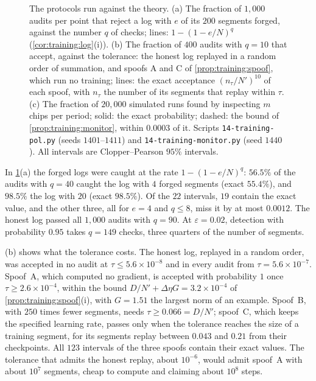 \begin{refsection}
\begin{figure}[t]
\caption{The protocols run against the theory. (a) The fraction of $1{,}000$ audits per point that reject a log with $e$ of its $200$ segments forged, against the number $q$ of checks; lines: $1-(1-e/N)^q$ (\cref{cor:training:log}(i)). (b) The fraction of $400$ audits with $q=10$ that accept, against the tolerance: the honest log replayed in a random order of summation, and spoofs A and C of \cref{prop:training:spoof}, which run no training; lines: the exact acceptance $(n_\tau/N')^{10}$ of each spoof, with $n_\tau$ the number of its segments that replay within $\tau$. (c) The fraction of $20{,}000$ simulated runs found by inspecting $m$ chips per period; solid: the exact probability; dashed: the bound of \cref{prop:training:monitor}, within $0.0003$ of it. Scripts \texttt{14-training-pol.py} (seeds $1401$--$1411$) and \texttt{14-training-monitor.py} (seed $1440$). All intervals are Clopper--Pearson $95\%$ intervals.}\label{fig:training:runs}
\end{figure}

In \cref{fig:training:runs}(a) the forged logs were caught at the rate $1-(1-e/N)^q$: $56.5\%$ of the audits with $q=40$ caught the log with $4$ forged segments (exact $55.4\%$), and $98.5\%$ the log with $20$ (exact $98.5\%$). Of the $22$ intervals, $19$ contain the exact value, and the other three, all for $e=4$ and $q\le8$, miss it by at most $0.0012$. The honest log passed all $1{,}000$ audits with $q=90$. At $\varepsilon=0.02$, detection with probability $0.95$ takes $q=149$ checks, three quarters of the number of segments.

(b) shows what the tolerance costs. The honest log, replayed in a random order, was accepted in no audit at $\tau\le5.6\times10^{-8}$ and in every audit from $\tau=5.6\times10^{-7}$. Spoof~A, which computed no gradient, is accepted with probability $1$ once $\tau\ge2.6\times10^{-4}$, within the bound $D/N'+\Delta\eta G=3.2\times10^{-4}$ of \cref{prop:training:spoof}(i), with $G=1.51$ the largest norm of an example. Spoof~B, with $250$ times fewer segments, needs $\tau\ge0.066=D/N'$; spoof~C, which keeps the specified learning rate, passes only when the tolerance reaches the size of a training segment, for its segments replay between $0.043$ and $0.21$ from their checkpoints. All $123$ intervals of the three spoofs contain their exact values. The tolerance that admits the honest replay, about $10^{-6}$, would admit spoof~A with about $10^{7}$ segments, cheap to compute and claiming about $10^{8}$ steps.


\end{refsection}
